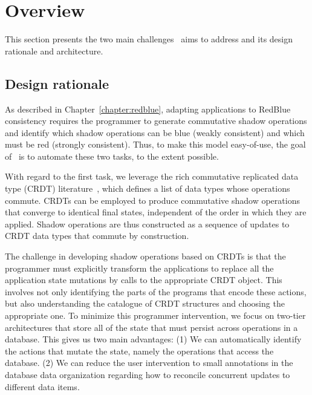 \section{Overview}
\label{ch:sieve:sect:overview}

This section presents the two main challenges \tool\ aims
to address and its design rationale and architecture.

\subsection{Design rationale}

As described in Chapter~\ref{chapter:redblue}, adapting applications
to RedBlue consistency requires the programmer to generate
commutative shadow operations and identify which shadow operations can be blue (weakly
consistent) and which must be red (strongly consistent). Thus, to make
this model easy-of-use, the goal of \tool\ is to automate these two tasks, to the extent possible.

With regard to the first task, we leverage the rich commutative replicated data type (CRDT)
literature~\cite{Shapiro2011Conflict,Preguica2009CRDT}, which
defines a list of data types whose operations commute. CRDTs can
be employed to produce commutative shadow operations that converge to identical
final states, independent of the order in which they are applied. 
Shadow operations are thus constructed as a sequence of updates to CRDT data
types that commute by construction.

The challenge in developing shadow operations based on CRDTs is that
the programmer must explicitly transform the applications to replace
all the application state mutations by calls to the
appropriate CRDT object. This involves not only identifying the parts
of the programs that encode these actions, but also understanding the
catalogue of CRDT structures and choosing the appropriate one.  To
minimize this programmer intervention, we 
focus on two-tier architectures that store all of the state that must
persist across operations in a database. This gives us two main
advantages: (1) We can automatically identify the actions that
mutate the state, namely the operations that access the
database. (2) We can reduce the user intervention to small
annotations in the database data organization regarding how to reconcile concurrent updates
to different data items.

